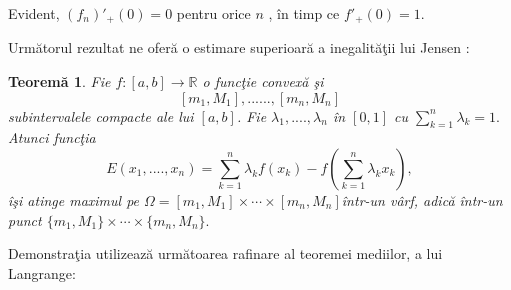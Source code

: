 \documentclass[a4paper,12pt,oneside]{report}
\newtheorem{theorem}{Teorem\u a}
\begin{document}
Evident, \({\left ( f_{n} \right )}'_{+}\left ( 0 \right ) = 0\) pentru orice \(n\) , \^{i}n timp ce \({f}'_{+}\left ( 0 \right ) = 1.\)

Urm\u{a}torul rezultat ne ofer\u{a} o estimare superioar\u{a} a inegalit\u{a}\c{t}ii lui Jensen :

\begin{theorem}
Fie \(f : \left [ a,b \right ] \rightarrow \mathbb{R}\) o func\c{t}ie convex\u{a} \c{s}i
\begin{displaymath}
   \left [ m_{1}, M_{1} \right ],......,\left [ m_{n}, M_{n} \right ]
\end{displaymath}
subintervalele compacte ale lui \(\left [ a,b \right ]\). Fie \(\lambda _{1}, ....,\lambda _{n}\) \^{i}n \(\left [ 0,1 \right ]\) cu \(\sum_{k = 1}^{n}\lambda _{k} = 1.\) Atunci func\c{t}ia
\begin{displaymath}
   E \left ( x_{1},....,x_{n} \right ) = \sum_{k = 1}^{n}\lambda _{k}f\left ( x_{k} \right ) - f\left ( \sum_{k=1}^{n}\lambda _{k}x_{k} \right ),
\end{displaymath}
\^{i}\c{s}i atinge maximul pe \(\Omega = \left [ m_{1}, M_{1} \right ] \times \cdots \times \left [ m_{n}, M_{n} \right ] \)\^{i}ntr-un v\^{a}rf, adic\u{a} \^{i}ntr-un punct \(\{ m_{1}, M_{1} \} \times \cdots \times   \{ m_{n}, M_{n} \}.\)
\end{theorem}
Demonstra\c{t}ia utilizeaz\u{a} urm\u{a}toarea rafinare al teoremei mediilor, a lui Langrange:
\end{document}
